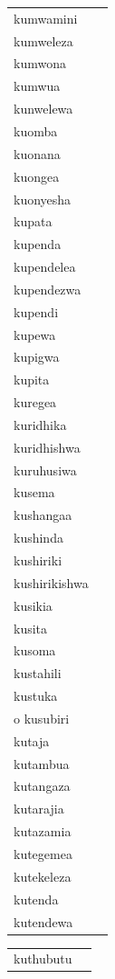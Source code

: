 \documentclass[output=paper,colorlinks,citecolor=brown,
]{langscibook}
\begin{document}
\begin{table}
\begin{footnotesize}
\begin{minipage}{.24\textwidth}
\begin{tabular}{ll}
kumwamini \\ 
kumweleza \\ 
kumwona \\ 

kumwua \\ 
kunwelewa \\ 
kuomba \\ 
kuonana \\ 
kuongea \\ 
kuonyesha \\ 
kupata \\ 
kupenda \\ 
kupendelea \\ 
kupendezwa \\ 
kupendi \\ 
kupewa \\ 
kupigwa \\ 
kupita \\ 
kuregea \\ 
kuridhika \\ 
kuridhishwa \\ 
kuruhusiwa \\ 
kusema \\ 
kushangaa \\ 
kushinda \\ 
kushiriki \\ 
kushirikishwa \\ 
kusikia \\ 
kusita \\ 
kusoma \\ 
kustahili \\ 
kustuka \\ o
kusubiri \\ 
kutaja \\ 
kutambua \\ 
kutangaza \\ 
kutarajia \\ 
kutazamia \\ 
kutegemea \\ 
kutekeleza \\ 
kutenda \\ 
kutendewa \\ 


\end{tabular}
\end{minipage}
\begin{minipage}{.24\textwidth}
\begin{tabular}{ll} 
kuthubutu \\ 


\end{tabular}
\end{minipage}
\end{footnotesize}
\end{table}
\end{document}
